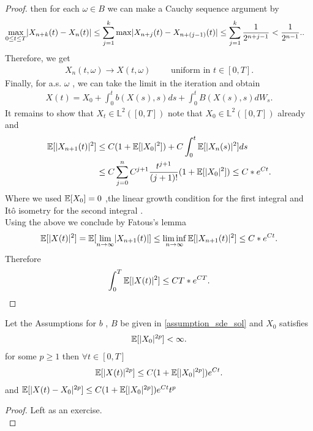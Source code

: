 \begin{proof}
   then for each $\omega  \in  B$  we can make a Cauchy sequence argument by
   \begin{align*}
     \max_{0\le t\le T} \lvert X_{n+k}(t) - X_{n}(t) \rvert &\le  \sum_{j=1}^{k} \max \lvert X_{n+j}(t) - X_{n+(j-1)}(t) \rvert\le \sum_{j=1}^{k} \frac{1}{2^{n+j-1} }< \frac{1}{2^{n-1} }. 
   .\end{align*}
   Therefore, we get 
   \begin{align*}
     X_{n}(t,\omega ) \to X(t,\omega ) \qquad \text{ uniform in } t\in [0,T]
   .\end{align*}
   Finally, for a.s. $\omega $ , we can take the limit in the iteration  and obtain 
   \begin{align*}
    X(t) = X_{0} + \int_0^{t} b(X(s),s) ds + \int_0^{t} B(X(s),s) dW_s  
   .\end{align*}
   It remains to show that $X_t \in  \mathbb{L}^2([0,T])$ note that $X_{0} \in  \mathbb{L}^2([0,T])$ already and 
   \begin{align*}
     \mathbb{E}[\lvert X_{n+1}(t)\rvert^2] &\le  C(1+\mathbb{E}[\lvert X_0\rvert^2]) + C \int_0^{t} \mathbb{E}[\lvert X_{n}(s) \rvert^2] ds \\
                           &\le  C \sum_{j=0}^{n} C^{j+1} \frac{t^{j+1}}{(j+1)!} (1+\mathbb{E}[\lvert X_0\rvert^2]) \le  C* e^{Ct} 
   .\end{align*}
   Where we used $\mathbb{E}[X_{0}] = 0$ ,the  linear growth condition for the first integral and It\^o isometry for the second integral .\\[1ex]
    Using the above we conclude by Fatous's lemma
    \begin{align*}
      \E[\abs{X(t)}^2] = \E[\lim_{n\to \infty} \abs{X_{n+1}(t) }]  \le  \liminf_{n\to \infty} \E[\abs{X_{n+1}(t) }^2] \le C*e^{Ct} 
    .\end{align*}
    Therefore 
    \begin{align*}
      \int_0^{T} \mathbb{E}[\lvert X(t)\rvert^2]  \le  CT*e^{CT} 
    .\end{align*}
\end{proof}

\begin{theorem}
 Let the Assumptions for $b$ , $B$ be given in \autoref{assumption_sde_sol} and $X_{0}$ satisfies
  \begin{align*}
    \mathbb{E}[\lvert X_0\rvert^{2p} ]< \infty
  .\end{align*}
  for some $p \ge 1$ then $\forall  t \in  [0,T]$ 
  \begin{align*}
    \mathbb{E}[\lvert X(t)\rvert^{2p}]\le C(1+\mathbb{E}[\lvert X_0\rvert^{2p} ])e^{Ct} 
  .\end{align*}
  and $\mathbb{E}[\lvert X(t) - X_0\rvert^{2p} ] \le  C(1+\mathbb{E}[\lvert X_0\rvert^{2p} ])e^{Ct}t^p $
\end{theorem}
\begin{proof}
 Left as an exercise. \\
\end{proof}
